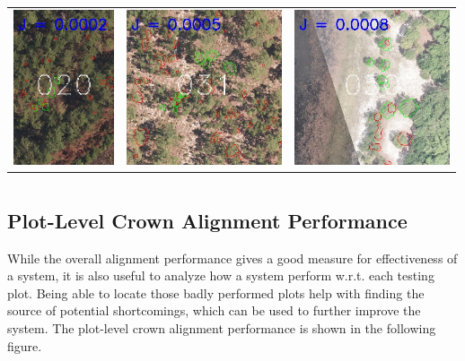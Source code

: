 \documentclass[]{report}   %
\begin{document}
\begin{table}
\begin{tabular}{lll}
\includegraphics[height=1.8in]{figure/bottom5_3.jpg} & \includegraphics[height=1.8in]{figure/bottom5_4.jpg} & \includegraphics[height=1.8in]{figure/bottom5_5.jpg} \\
\end{tabular}
\end{table}





\newpage
\section*{\color{blue}{Task 2 - Crown Alignment}}
\subsection*{Plot-Level Crown Alignment Performance}
While the overall alignment performance gives a good measure for effectiveness of a system, it is also useful to analyze how a system perform w.r.t. each testing plot. Being able to locate those badly performed plots help with finding the source of potential shortcomings, which can be used to further improve the system. The plot-level crown alignment performance is shown in the following figure.
\\
\begin{figure}[H]
    \centering
    \def\svgwidth{0.9\columnwidth}
    
\end{figure}
\end{document}
